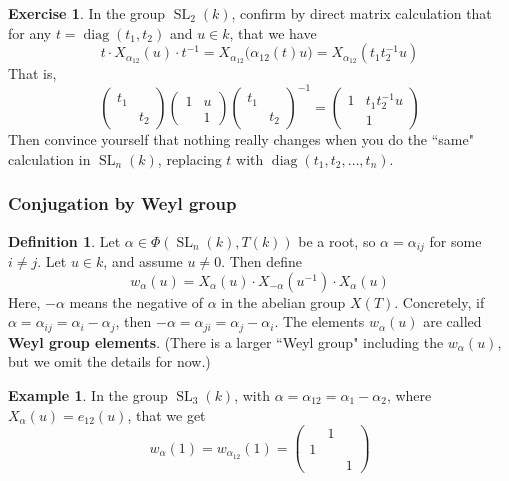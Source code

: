 \documentclass[12pt]{article}
\theoremstyle{definition}
\newtheorem{definition}[theorem]{Definition}
\newtheorem{example}[theorem]{Example}
\newtheorem{exercise}[theorem]{Exercise}
\numberwithin{theorem}{subsection}
\newcommand{\tbf}{\textbf}
\newcommand{\inv}{^{-1}}
\DeclareMathOperator{\SL}{SL}
\DeclareMathOperator{\diag}{diag}
\begin{document}
\begin{exercise}
In the group $\SL_2(k)$, confirm by direct matrix calculation that for any $t = \diag(t_1, t_2)$ and $u \in k$, that we have
\[
	t \cdot X_{\alpha_{12}}(u) \cdot t \inv = X_{\alpha_{12}} \Big( \alpha_{12}(t) u \Big) = X_{\alpha_{12}} ( t_1 t_2 \inv u )
\]
That is,
\[
	\begin{pmatrix}
		t_1 \\
		& t_2
	\end{pmatrix}
	\begin{pmatrix}
		1 & u \\
		& 1
	\end{pmatrix}
	\begin{pmatrix}
		t_1 \\
		& t_2
	\end{pmatrix} \inv
	=
	\begin{pmatrix}
		1 & t_1 t_2 \inv u  \\
		& 1
	\end{pmatrix}
\]
Then convince yourself that nothing really changes when you do the ``same" calculation in $\SL_n(k)$, replacing $t$ with $\diag(t_1, t_2, \ldots, t_n)$.
\end{exercise}

\subsubsection{Conjugation by Weyl group}

\begin{definition}
Let $\alpha \in \Phi(\SL_n(k), T(k))$ be a root, so $\alpha = \alpha_{ij}$ for some $i \neq j$. Let $u \in k$, and assume $u \neq 0$. Then define
\[
	w_\alpha(u) = X_\alpha(u) \cdot X_{-\alpha}( u \inv) \cdot X_\alpha(u)
\]
Here, $-\alpha$ means the negative of $\alpha$ in the abelian group $X(T)$. Concretely, if $\alpha = \alpha_{ij} = \alpha_i - \alpha_j$, then $- \alpha = \alpha_{ji} = \alpha_j - \alpha_i$. The elements $w_\alpha(u)$ are called \tbf{Weyl group elements}. (There is a larger ``Weyl group" including the $w_\alpha(u)$, but we omit the details for now.)
\end{definition}

\begin{example}
In the group $\SL_3(k)$, with $\alpha = \alpha_{12} = \alpha_1 - \alpha_2$, where $X_\alpha(u) = e_{12}(u)$, that we get
\[
	w_\alpha(1) = w_{\alpha_{12}}(1) =
	\begin{pmatrix}
		& 1 \\
		1 \\
		&& 1
	\end{pmatrix}
\]
\end{example}
\end{document}
